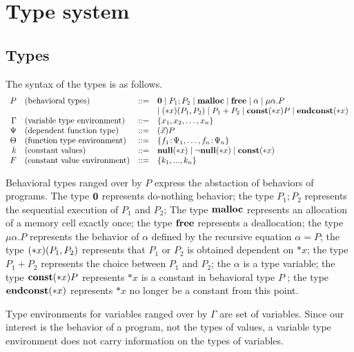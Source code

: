 \section{Type system}
\label{sec:typesystem}

\subsection{Types}
The syntax of the types is as follows.
\[
\begin{array}{rlcl}
  P & (\mbox{behavioral types})&::=& {\bf 0} \mid P_{1};P_{2}  \mid \mathbf{malloc} \mid \mathbf{free} \mid \alpha \mid \mu\alpha.P \\
  &  &  & \mid (*x)(P_1,P_2) \mid P_1 + P_2 \mid \mathbf{const}(*x) P  \mid \mathbf{endconst}(*x)\\
  \Gamma & (\mbox{variable type environment}) &::=& \{x_1, x_2, \dots, x_n\}\\
  \Psi & (\mbox{dependent function type}) &::=& (\vec{x})P\\
  \Theta & (\mbox{function type environment}) &::=& \{f_1\!:\! \Psi_1,\dots,f_n\!:\! \Psi_n\}\\
  k & (\mbox{constant values}) &::=& {\bf null}(*x) \mid \neg{\bf null}(*x) \mid \mathbf{const}(*x)   \\
  F & (\mbox{constant value environment}) &::=& \{k_1,...,k_n\} \\
\end{array}
\]

Behavioral types ranged over by \(P\) express the abstaction of
behaviors of programs. The type \({\bf 0}\) represents do-nothing
behavior; the type \(P_1;P_2\) represents the sequential execution of
\(P_1\) and \(P_2\); The type \(\mathbf{malloc}\) represents an allocation of
a memory cell exactly once; the type \(\mathbf{free}\) represents a
deallocation; the type \(\mu \alpha.P\) represents the behavior of
\(\alpha\) defined by the recursive equation \(\alpha = P\); the type
\((*x)(P_1,P_2)\) represents that \(P_1\) or \(P_2\) is obtained
dependent on \(*x\); the type \(P_1 + P_2\) represents the choice
between \(P_1\) and \(P_2\); the \(\alpha\) is a type variable; the
type \(\mathbf{const}(*x) P\) represents \(*x\) is a constant in behavioral
type \(P\) ; the type \(\mathbf{endconst}(*x)\) represents \(*x\) no longer be a
constant from this point.

Type environments for variables ranged over by \(\Gamma\) are set of
variables.  Since our interest is the behavior of a program, not the
types of values, a variable type environment does not carry
information on the types of variables.

